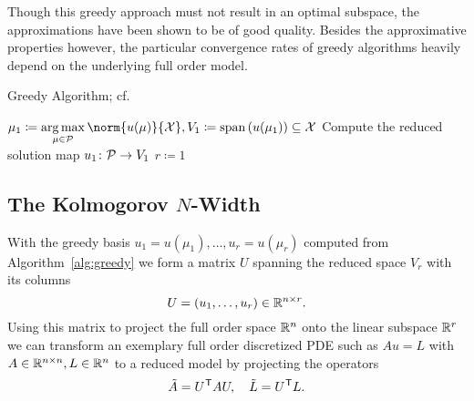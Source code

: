 Though this greedy approach must not result in an optimal subspace, the approximations have been shown to be of good quality.
Besides the approximative properties however, the particular convergence rates of greedy algorithms heavily depend on the underlying full order model.

\begin{algorithm}\label{alg:greedy}
    \caption{Greedy Algorithm; cf.~\cite[Algorithm~1]{Buffa2012}}
    $\mu_1 \coloneqq \argmax\limits_{\mu \in \mcl{P}} \norm{u(\mu)}{\mcl{X}}, V_1 \coloneqq \lspn{u(\mu_1)} \subseteq \mcl{X}$\;
    Compute the reduced solution map $u_1 \colon \mathcal{P} \to V_1$\;
    $r \coloneqq 1$\;
\end{algorithm}

\subsection[The Kolmogorov N-Width]{The Kolmogorov {$N$}-Width}\label{subsec:kolmogorov-n-width}

With the greedy basis $u_1 = u(\mu_1), \dots, u_r = u(\mu_r)$ computed from Algorithm~\ref{alg:greedy} we form a matrix $U$ spanning the reduced space $V_r$ with its columns
\begin{equation*}
    U = \left( u_1, \dots, u_r \right) \in \mathbb{R}^{n \times r}.
\end{equation*}
Using this matrix to project the full order space $\mathbb{R}^n$ onto the linear subspace $\mathbb{R}^r$ we can transform an exemplary full order discretized \ac{PDE} such as $A u = L$ with $A \in \mathbb{R}^{n \times n}, L \in \mathbb{R}^n$ to a reduced model by projecting the operators
\begin{equation*}
    \tilde{A} = U^{\mkern1mu \mathsf{T}} A U,\quad \tilde{L} = U^{\mkern1mu \mathsf{T}} L.
\end{equation*}

